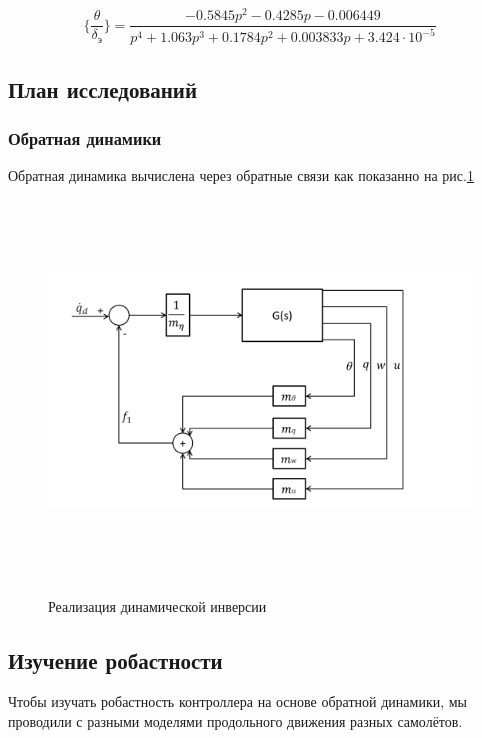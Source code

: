 \begin{equation}
    \label{eq:ПФ по углу наклона траектории}
    \{ \frac{\theta}{\delta_\text{э}} \} = \frac{-0.5845p^2 - 0.4285p - 0.006449}{p^4 + 1.063p^3 + 0.1784p^2 + 0.003833p + 3.424 \cdot 10^{-5}}
\end{equation}

\subsection{План исследований}
\subsubsection{Обратная динамики }
Обратная динамика вычислена через обратные связи как показанно на рис.\ref{fig:САУ_ОД}
\begin{figure}[H]
    \centering \includegraphics[width=15cm,height=10cm]{Оглавление/Part3/figures/САУ_ОД.png}
    \caption{Реализация динамической инверсии}
    {\label{fig:САУ_ОД}}
    \end{figure}
\subsection{Изучение робастности} 

Чтобы изучать робастность контроллера на основе обратной динамики, мы проводили  с разными моделями продольного движения разных самолётов. 

